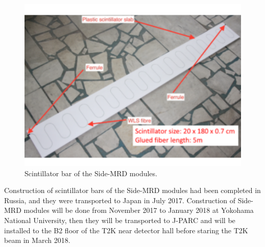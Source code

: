 \begin{figure}[tbh]
\begin{center}
\includegraphics[width=0.8\linewidth]{fig/side_mrd_scintillator.pdf}
\end{center}
\caption{
Scintillator bar of the Side-MRD modules.
}
\label{fig:side_mrd_scintillator}
\end{figure}


Construction of scintillator bars of the Side-MRD modules had been completed in Russia, and they were transported to Japan in July 2017. 
Construction of Side-MRD modules will be done from November 2017 to January 2018 at Yokohama National University, then they will be transported to J-PARC and will be installed to the B2 floor of the T2K near detector hall before staring the T2K beam in March 2018.
